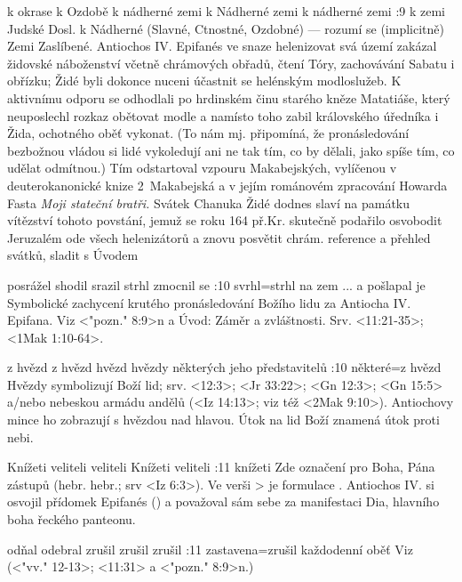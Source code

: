    {k okrase}   %
   {k Ozdobě}   %
   {k nádherné zemi}   %
   {k Nádherné zemi}   %
   {k nádherné zemi}   %
:9 {k zemi Judské} Dosl. k Nádherné (Slavné, Ctnostné, Ozdobné) --- rozumí se (implicitně) Zemi Zaslíbené. Antiochos IV. Epifanés ve snaze helenizovat svá území zakázal židovské náboženství včetně chrámových obřadů, čtení Tóry, zachovávání Sabatu i obřízku; Židé byli dokonce nuceni účastnit se helénským modloslužeb. K aktivnímu odporu se odhodlali po hrdinském činu starého kněze Matatiáše, který neuposlechl rozkaz obětovat modle a namísto toho zabil královského úředníka i Žida, ochotného oběť vykonat. (To nám mj. připomíná, že pronásledování bezbožnou vládou si lidé vykoledují ani ne tak tím, co by dělali, jako spíše tím, co udělat odmítnou.)
Tím odstartoval vzpouru Makabejských, vylíčenou v deuterokanonické knize 2~Makabejská a v jejím románovém zpracování Howarda Fasta {\em Moji stateční bratři.}
Svátek Chanuka Židé dodnes slaví na památku vítězství tohoto povstání, jemuž se roku 164 př.Kr. skutečně podařilo osvobodit Jeruzalém ode všech helenizátorů a znovu posvětit chrám.
\dopsat reference a přehled svátků, sladit s Úvodem


   {posrážel}   %
   {shodil}   %
   {srazil}   %
   {strhl}   %
   {zmocnil se}   %
:10 {svrhl}={strhl na zem ... a pošlapal je} Symbolické zachycení krutého pronásledování Božího lidu za Antiocha IV. Epifana. Viz <"pozn." 8:9>n a Úvod: Záměr a zvláštnosti. Srv. <11:21-35>; <1Mak 1:10-64>. %

    {z hvězd}   %
    {z hvězd}   %
    {hvězd}   %
    {hvězdy}   %
    {některých jeho představitelů}   %
:10 {některé}={z hvězd} Hvězdy symbolizují Boží lid; srv. <12:3>; <Jr 33:22>; <Gn 12:3>;  <Gn 15:5> a/nebo nebeskou armádu andělů %
(<Iz 14:13>; viz též <2Mak 9:10>). %
Antiochovy mince ho zobrazují s hvězdou nad hlavou. Útok na lid Boží znamená útok proti nebi.


   {Knížeti}   %
   {veliteli}   %
   {veliteli}   %
   {Knížeti}   %
   {veliteli}   %
:11 {knížeti} Zde označení pro Boha, Pána zástupů (hebr. \dopsat hebr.; srv <Iz 6:3>). Ve verši > je formulace . Antiochos IV. si osvojil přídomek Epifanés () a považoval sám sebe za manifestaci Dia, hlavního boha řeckého panteonu. 

   {odňal}   %
   {odebral}   %
   {zrušil}   %
   {zrušil}   %
   {zrušil}   %
:11 {zastavena}={zrušil každodenní oběť} Viz (<"vv." 12-13>; <11:31> a <"pozn." 8:9>n.)

